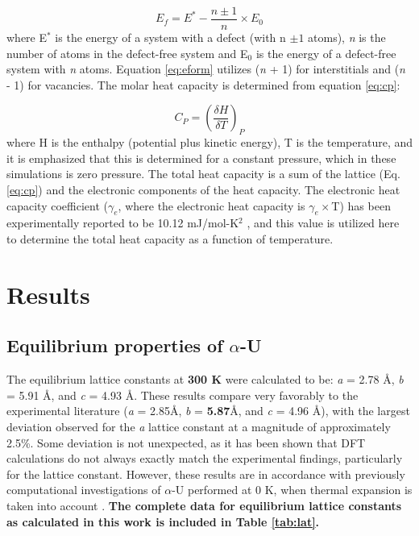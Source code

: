\documentclass[utf8]{frontiersSCNS} %
\providecommand{\DIFaddtex}[1]{{\bf #1}} %
\providecommand{\DIFdeltex}[1]{} %
\providecommand{\DIFaddbegin}{\protect\color{blue}} %
\providecommand{\DIFaddend}{\protect\color{black}} %
\providecommand{\DIFdelbegin}{\protect\color{red}} %
\providecommand{\DIFdelend}{\protect\color{black}} %
\providecommand{\DIFadd}[1]{\texorpdfstring{\DIFaddtex{#1}}{#1}} %
\providecommand{\DIFdel}[1]{\texorpdfstring{\DIFdeltex{#1}}{}} %
\begin{document}
\begin{equation}
\label{eq:eform}
E_f = E^* - \frac{n \pm 1}{n} \times E_0
\end{equation}where E$^{*}$ is the energy of a system with a defect (with n $\pm 1$ atoms), \textit{n} is the number of atoms in the defect-free system and E$_{0}$ is the energy of a defect-free system with \textit{n} atoms. Equation \ref{eq:eform} utilizes (\textit{n} + 1) for interstitials and (\textit{n} - 1) for vacancies. The molar heat capacity is determined from equation \ref{eq:cp}:

\begin{equation}
\label{eq:cp}
C_{P} = \left(\frac{\delta H}{\delta T}\right)_{P}
\end{equation}where H is the enthalpy (potential plus kinetic energy), T is the temperature, and it is emphasized that this is determined for a constant pressure, which in these simulations is zero pressure. The total heat capacity is a sum of the lattice (Eq. \ref{eq:cp}) and the electronic components of the heat capacity. The electronic heat capacity coefficient ($\gamma_e$, where the electronic heat capacity is $\gamma_e\times$T) has been experimentally reported to be 10.12 mJ/mol-K$^2$ \cite{marchidan1976, schachinger1989} , and this value is utilized here to determine the total heat capacity as a function of temperature. 

\section{Results}

\subsection{Equilibrium properties of $\alpha$-U}

The equilibrium lattice constants at \DIFdelbegin \DIFdel{room temperature }\DIFdelend \DIFaddbegin \DIFadd{300 K }\DIFaddend were calculated to be: \textit{a} = 2.78 \AA, \textit{b} = 5.91 \AA, and \textit{c} = 4.93 \AA. These results compare very favorably to the experimental literature (\textit{a} = 2.85\AA, \textit{b} = \DIFdelbegin \DIFdel{5.86}\DIFdelend \DIFaddbegin \DIFadd{5.87}\DIFaddend \AA, and \textit{c} = 4.96 \AA \cite{lawson1988}), with the largest deviation observed for the \textit{a} lattice constant at a magnitude of approximately 2.5\%. Some deviation is not unexpected, as it has been shown that DFT calculations do not always exactly match the experimental findings, particularly for the lattice constant. However, these results are in accordance with previously computational investigations of $\alpha$-U performed at 0 K, when thermal expansion is taken into account \cite{wirth2011,beeler2013}. \DIFaddbegin \DIFadd{The complete data for equilibrium lattice constants as calculated in this work is included in Table \ref{tab:lat}. 
}\DIFaddend 
\end{document}
